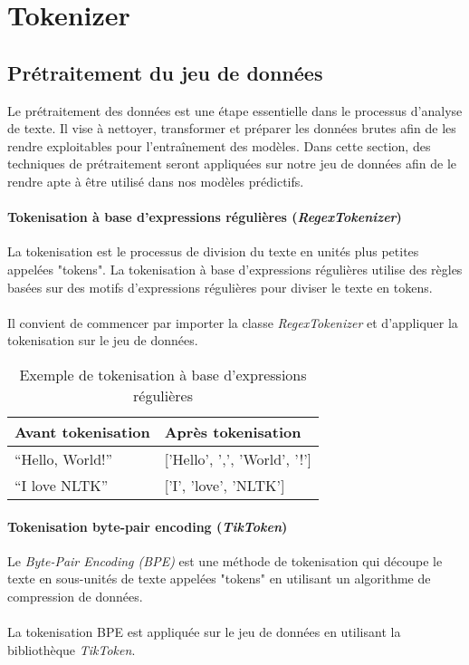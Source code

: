 \chapter{Tokenizer}

\section{Prétraitement du jeu de données}

Le prétraitement des données est une étape essentielle dans le processus d'analyse de texte. Il vise à nettoyer, transformer et préparer les données brutes afin de les rendre exploitables pour l'entraînement des modèles. Dans cette section, des techniques de prétraitement seront appliquées sur notre jeu de données afin de le rendre apte à être utilisé dans nos modèles prédictifs.

\subsubsection{Tokenisation à base d'expressions régulières (\textit{RegexTokenizer})}

La tokenisation est le processus de division du texte en unités plus petites appelées "tokens". La tokenisation à base d’expressions régulières utilise des règles basées sur des motifs d'expressions régulières pour diviser le texte en tokens. \\
\\
Il convient de commencer par importer la classe \textit{RegexTokenizer} et d'appliquer la tokenisation sur le jeu de données.

\begin{table}[h]
\centering
\begin{tabular}{|l|l|}
\hline
\textbf{Avant tokenisation} & \textbf{Après tokenisation} \\ \hline
``Hello, World!'' & ['Hello', ',', 'World', '!'] \\ \hline
``I love NLTK'' & ['I', 'love', 'NLTK'] \\ \hline
\end{tabular}
\caption{Exemple de tokenisation à base d'expressions régulières}
\end{table}

\subsubsection{Tokenisation byte-pair encoding (\textit{TikToken})}

Le \textit{Byte-Pair Encoding (BPE)} est une méthode de tokenisation qui découpe le texte en sous-unités de texte appelées "tokens" en utilisant un algorithme de compression de données.
\\
\\
La tokenisation BPE est appliquée sur le jeu de données en utilisant la bibliothèque \textit{TikToken}.

